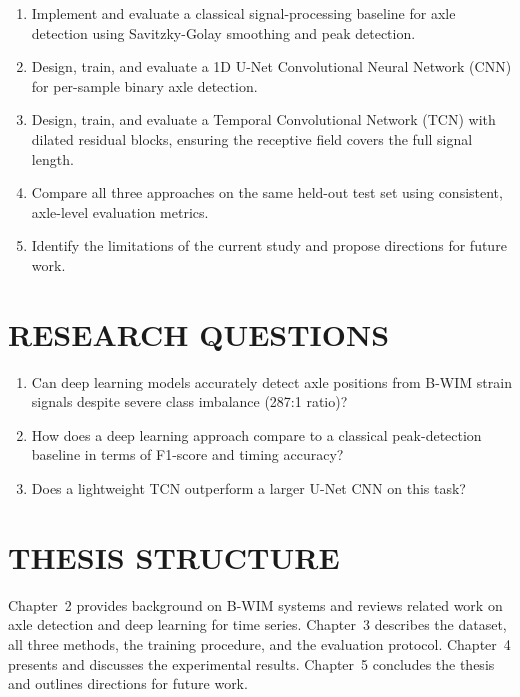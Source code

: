 \begin{enumerate}
    \item Implement and evaluate a classical signal-processing baseline for axle
          detection using Savitzky-Golay smoothing and peak detection.
    \item Design, train, and evaluate a 1D U-Net Convolutional Neural Network
          (CNN) for per-sample binary axle detection.
    \item Design, train, and evaluate a Temporal Convolutional Network (TCN) with
          dilated residual blocks, ensuring the receptive field covers the full
          signal length.
    \item Compare all three approaches on the same held-out test set using
          consistent, axle-level evaluation metrics.
    \item Identify the limitations of the current study and propose directions
          for future work.
\end{enumerate}

\section{RESEARCH QUESTIONS}

\begin{enumerate}
    \item Can deep learning models accurately detect axle positions from B-WIM
          strain signals despite severe class imbalance (287:1 ratio)?
    \item How does a deep learning approach compare to a classical peak-detection
          baseline in terms of F1-score and timing accuracy?
    \item Does a lightweight TCN outperform a larger U-Net CNN on this task?
\end{enumerate}

\section{THESIS STRUCTURE}

Chapter~2 provides background on B-WIM systems and reviews related work on axle
detection and deep learning for time series. Chapter~3 describes the dataset, all
three methods, the training procedure, and the evaluation protocol. Chapter~4
presents and discusses the experimental results. Chapter~5 concludes the thesis
and outlines directions for future work.
